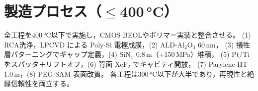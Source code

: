 \section{製造プロセス（$\leq$400\,\si{\celsius}）}
全工程を400\,\si{\celsius}以下で実施し，CMOS BEOLやポリマー実装と整合させる。
(1) RCA洗浄，LPCVD による Poly-Si 電極成膜，(2) ALD-Al$_2$O$_3$ 60\,nm，
(3) 犠牲層パターニングでギャップ定義，(4) SiN$_x$ 0.8\,\textmu m（+150\,MPa）堆積，
(5) Pt/Ti をスパッタ＋リフトオフ，(6) 背面 XeF$_2$ でキャビティ開放，
(7) Parylene-HT 1.0\,\textmu m，(8) PEG-SAM 表面改質。
各工程は300\,\si{\celsius}以下が大半であり，再現性と絶縁信頼性を両立する。
